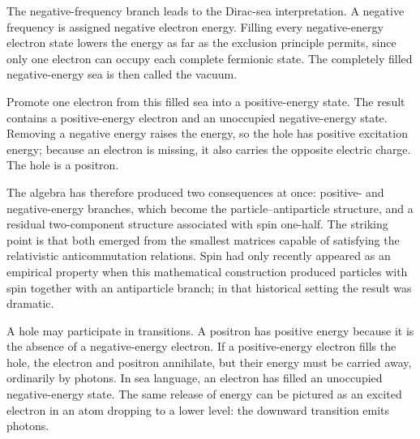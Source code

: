 The negative-frequency branch leads to the Dirac-sea interpretation. A negative frequency is assigned negative electron energy. Filling every negative-energy electron state lowers the energy as far as the exclusion principle permits, since only one electron can occupy each complete fermionic state. The completely filled negative-energy sea is then called the vacuum.

Promote one electron from this filled sea into a positive-energy state. The result contains a positive-energy electron and an unoccupied negative-energy state. Removing a negative energy raises the energy, so the hole has positive excitation energy; because an electron is missing, it also carries the opposite electric charge. The hole is a positron.

\begin{classroomqa}
\end{classroomqa}

The algebra has therefore produced two consequences at once: positive- and negative-energy branches, which become the particle--antiparticle structure, and a residual two-component structure associated with spin one-half. The striking point is that both emerged from the smallest matrices capable of satisfying the relativistic anticommutation relations. Spin had only recently appeared as an empirical property when this mathematical construction produced particles with spin together with an antiparticle branch; in that historical setting the result was dramatic.

\begin{classroomqa}
\end{classroomqa}

A hole may participate in transitions. A positron has positive energy because it is the absence of a negative-energy electron. If a positive-energy electron fills the hole, the electron and positron annihilate, but their energy must be carried away, ordinarily by photons. In sea language, an electron has filled an unoccupied negative-energy state. The same release of energy can be pictured as an excited electron in an atom dropping to a lower level: the downward transition emits photons.

